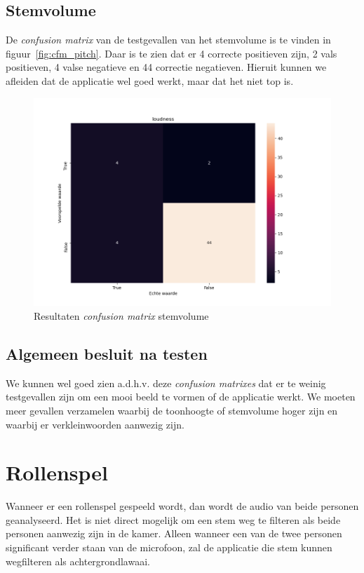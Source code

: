 \subsection{Stemvolume}

De \textit{confusion matrix} van de testgevallen van het stemvolume is te vinden in figuur~\ref{fig:cfm_pitch}. Daar is te zien dat er 4 correcte positieven zijn, 2 vals positieven, 4 valse negatieve en 44 correctie negatieven.
Hieruit kunnen we afleiden dat de applicatie wel goed werkt, maar dat het niet top is.
\begin{figure}
	\centering
	\includegraphics[width=1\textwidth]{./img/cfm_loudness}
	\caption{\label{fig:cfm_loudness} Resultaten \textit{confusion matrix} stemvolume}
\end{figure}

\subsection{Algemeen besluit na testen}
We kunnen wel goed zien a.d.h.v. deze \textit{confusion matrixes} dat er te weinig testgevallen zijn om een mooi beeld te vormen of de applicatie werkt. We moeten meer gevallen verzamelen waarbij de toonhoogte of stemvolume hoger zijn en waarbij er verkleinwoorden aanwezig zijn.

\section{Rollenspel}
Wanneer er een rollenspel gespeeld wordt, dan wordt de audio van beide personen geanalyseerd. Het is niet direct mogelijk om een stem weg te filteren als beide personen aanwezig zijn in de kamer. Alleen wanneer een van de twee personen significant verder staan van de microfoon, zal de applicatie die stem kunnen wegfilteren als achtergrondlawaai.

